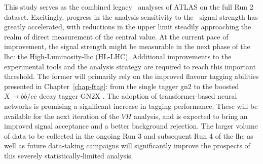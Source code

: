 This study serves as the combined legacy \vhbc\ analyses of ATLAS on the full Run 2 dataset. Excitingly, progress in the analysis sensitivity to the \vhc\ signal strength has greatly accelerated, with reductions in the upper limit steadily approaching the realm of direct measurement of the central value. At the current pace of improvement, the signal strength might be measurable in the next phase of the \gls{lhc}: the High-Luminosity-\gls{lhc} (HL-LHC). Additional improvements to the experimental tools and the analysis strategy are required to reach this important threshold. The former will primarily rely on the improved flavour tagging abilities presented in Chapter~\ref{chap-ftag}: from the single tagger \gls{gn2} to the boosted $X \rightarrow b\bar{b} / c\bar{c}$ decay tagger GN2X \cite{ATL-PHYS-PUB-2023-021}. The adoption of transformer-based neural networks is promising a significant increase in tagging performance. These will be available for the next iteration of the $VH$ analysis, and is expected to bring an improved signal acceptance and a better background rejection. The larger volume of data to be collected in the ongoing Run 3 and subsequent Run 4 of the \gls{lhc} as well as future data-taking campaigns will significantly improve the prospects of this severely statistically-limited analysis. 